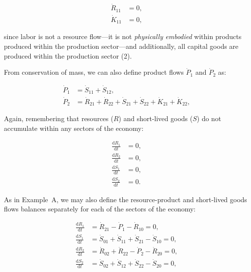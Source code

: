 \begin{align}\label{eq:B_R11_K11}
	\dot{R}_{11}				& 
	= 0,								\\
	\dot{K}_{11}				& 
	= 0,
\end{align}

\noindent{}since labor is not a resource flow---it
is not \emph{physically embodied} within products
produced within the production sector---and additionally, 
all capital goods are produced within
the production sector (2).





From conservation of mass,
we can also define product flows
$\dot{P}_{1}$ and $\dot{P}_{2}$ as:

\begin{align}
\label{eq:B_P1_def}
	\dot{P}_{1}				&
	= \dot{S}_{11}
	+ \dot{S}_{12},			\\
\label{eq:B_P2_def}
	\dot{P}_{2}				&
	= \dot{R}_{21}
	+ \dot{R}_{22}
	+ \dot{S}_{21}
	+ \dot{S}_{22}
	+ \dot{K}_{21}	 
	+ \dot{K}_{22},
\end{align}

\noindent Again, remembering that resources ($R$) 
and short-lived goods ($S$) do not accumulate 
within any sectors of the economy:

\begin{align}\label{eq:dR_and_dS_zero}
	\frac{\mathrm{d}R_{1}}{\mathrm{d}t}			&
	= 0,																	\\
	\frac{\mathrm{d}R_{2}}{\mathrm{d}t} 			&
	= 0,																	\\
	\frac{\mathrm{d}S_{1}}{\mathrm{d}t} 			&
	= 0,																	\\
	\frac{\mathrm{d}S_{2}}{\mathrm{d}t} 			&
	= 0.
\end{align}

As in Example~A,
we may also define the resource-product
and short-lived goods flows balances separately
for each of the sectors of the economy:

\begin{align}
	\frac{\mathrm{d}R_{1}}{\mathrm{d}t} 	&
	= \dot{R}_{21}
	- \dot{P}_{1}
	- \dot{R}_{10}
	= 0,															\\
\label{eq:B_dS1}
	\frac{\mathrm{d}S_{1}}{\mathrm{d}t} 	&
	= \dot{S}_{01}
	+ \dot{S}_{11}
	+ \dot{S}_{21}
	- \dot{S}_{10}
	= 0,															\\
	\frac{\mathrm{d}R_{2}}{\mathrm{d}t} 	&
	= \dot{R}_{02}
	+ \dot{R}_{22}
	- \dot{P}_{2}
	- \dot{R}_{20}
	= 0,															\\
\label{eq:B_dS2}
	\frac{\mathrm{d}S_{2}}{\mathrm{d}t} 	&
	= \dot{S}_{02}
	+ \dot{S}_{12}
	+ \dot{S}_{22}
	- \dot{S}_{20}
	= 0,
\end{align}

